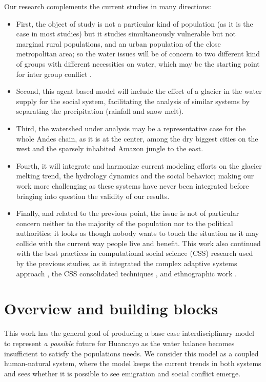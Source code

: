 \documentclass{article}
\begin{document}
Our research complements the current studies in many directions: 
\begin{itemize}
\item First, the object of study is not a particular kind of population (as it is the case in most studies) but it studies simultaneously vulnerable but not marginal rural populations, and an urban population of the close metropolitan area; so the water issues will be of concern to two different kind of groups with different necessities on water, which may be the starting point for inter group conflict \cite{bar-tal_intergroup_2011}. 
\item Second, this agent based model will include the effect of a glacier in the water supply for the social system, facilitating the analysis of similar systems by separating the precipitation (rainfall and snow melt). 
\item Third, the watershed under analysis may be a representative case for the whole Andes chain, as it is at the center, among the dry biggest cities on the west and the sparsely inhabited Amazon jungle to the east. 
\item Fourth, it will integrate and harmonize current modeling efforts on the glacier melting trend, the hydrology dynamics and the social behavior; making our work more challenging as these systems have never been integrated before bringing into question the validity of our results. 
\item Finally, and related to the previous point, the issue is not of particular concern neither to the majority of the population nor to the political authorities; it looks as though nobody wants to touch the situation as it may collide with the current way people live and benefit. This work also continued with the best practices in computational social science (CSS) research used by the previous studies, as it  integrated the complex adaptive systems approach \cite{miller_complex_2007}, the CSS consolidated techniques \cite{cioffi-revilla_introduction_2014}, and ethnographic work \cite{crate_anthropology_2009}.
\end{itemize}

\section{Overview and building blocks}

This work has the general goal of producing a base case interdisciplinary model to represent \emph{a possible} future for Huancayo as the water balance becomes insufficient to satisfy the population\textquotesingle s needs. We consider this model as a coupled human-natural system, where the model keeps the current trends in both systems and sees whether it is possible to see emigration and social conflict emerge.
\end{document}

